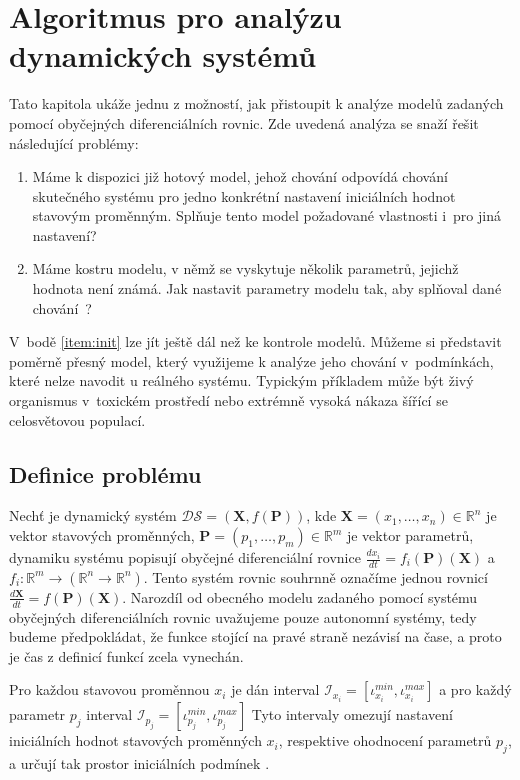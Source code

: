 \chapter{Algoritmus pro analýzu dynamických systémů}\label{chapter:algorithm}

Tato kapitola ukáže jednu z možností, jak přistoupit k analýze modelů zadaných
pomocí obyčejných diferenciálních rovnic. Zde uvedená analýza se snaží řešit následující
problémy:
\begin{enumerate}
	\item\label{item:init}	Máme k dispozici již hotový model, jehož chování odpovídá chování skutečného
			systému pro jedno konkrétní nastavení iniciálních hodnot stavovým
			proměnným. Splňuje tento model požadované vlastnosti i~pro jiná nastavení?
	\item	Máme kostru modelu, v němž se vyskytuje několik parametrů, jejichž hodnota
			není známá. Jak nastavit parametry modelu tak, aby splňoval dané chování~\cite{aster2012}?
\end{enumerate}

V~bodě \ref{item:init} lze jít ještě dál než ke kontrole modelů. Můžeme si představit
poměrně přesný model, který využijeme k analýze jeho chování v~pod\-mín\-kách, které nelze
navodit u reálného systému. Typickým příkladem může být živý organismus v~toxickém
prostředí nebo extrémně vysoká nákaza šířící se ce\-lo\-svě\-to\-vou populací.

\section{Definice problému}\label{section:initial:condtion:problem:definition}

Nechť je dynamický systém $\mathcal{DS} = (\mathbf{X}, f(\mathbf{P}))$, kde $\mathbf{X} = (x_1, \ldots, x_n) \in \mathbb{R}^n$
je vektor stavových proměnných, $\mathbf{P}  = (p_1, \ldots, p_m) \in \mathbb{R}^m$ je vektor parametrů, dynamiku systému popisují obyčejné diferenciální
rovnice $\frac{dx_i}{dt} = f_i(\mathbf{P})(\mathbf{X})$ a $f_i: \mathbb{R}^m \rightarrow (\mathbb{R}^n \rightarrow \mathbb{R}^n)$.
Tento systém rovnic souhrnně označíme jednou rovnicí $\frac{d\mathbf{X}}{dt} = f(\mathbf{P})(\mathbf{X})$. Narozdíl
od obecného modelu zadaného pomocí systému obyčejných diferenciálních rovnic uvažujeme pouze autonomní systémy,
tedy budeme předpokládat, že funkce stojící na pravé straně ne\-zá\-vi\-sí na čase, a proto je čas z definicí funkcí zcela vynechán.

Pro každou stavovou proměnnou $x_i$ je dán interval $\mathcal{I}_{x_i} = [\iota_{x_i}^{min}, \iota_{x_i}^{max}]$
a pro každý parametr $p_j$ interval $\mathcal{I}_{p_j} = [\iota_{p_j}^{min}, \iota_{p_j}^{max}]$
Tyto intervaly omezují nastavení iniciálních hodnot stavových proměnných $x_i$, respektive o\-hod\-no\-ce\-ní
parametrů $p_j$, a určují tak prostor iniciálních podmínek \cite[str. 23]{drazan2011}.

